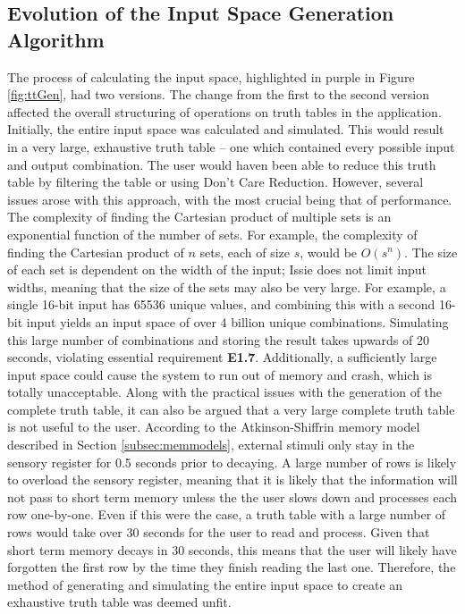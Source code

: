 \subsection{Evolution of the Input Space Generation Algorithm}
The process of calculating the input space, highlighted in purple in Figure \ref{fig:ttGen}, had two versions. The change from the first to the second version affected the overall structuring of operations on truth tables in the application. Initially, the entire input space was calculated and simulated. This would result in a very large, exhaustive truth table -- one which contained every possible input and output combination. The user would haven been able to reduce this truth table by filtering the table or using Don't Care Reduction. However, several issues arose with this approach, with the most crucial being that of performance. The complexity of finding the Cartesian product of multiple sets is an exponential function of the number of sets. For example, the complexity of finding the Cartesian product of $n$ sets, each of size $s$, would be $O(s^n)$. The size of each set is dependent on the width of the input; Issie does not limit input widths, meaning that the size of the sets may also be very large. For example, a single 16-bit input has 65536 unique values, and combining this with a second 16-bit input yields an input space of over 4 billion unique combinations. Simulating this large number of combinations and storing the result takes upwards of 20 seconds, violating essential requirement \textbf{E1.7}. Additionally, a sufficiently large input space could cause the system to run out of memory and crash, which is totally unacceptable. Along with the practical issues with the generation of the complete truth table, it can also be argued that a very large complete truth table is not useful to the user. According to the Atkinson-Shiffrin memory model described in Section \ref{subsec:memmodels}, external stimuli only stay in the sensory register for 0.5 seconds prior to decaying. A large number of rows is likely to overload the sensory register, meaning that it is likely that the information will not pass to short term memory unless the the user slows down and processes each row one-by-one. Even if this were the case, a truth table with a large number of rows would take over 30 seconds for the user to read and process. Given that short term memory decays in 30 seconds, this means that the user will likely have forgotten the first row by the time they finish reading the last one. Therefore, the method of generating and simulating the entire input space to create an exhaustive truth table was deemed unfit.

